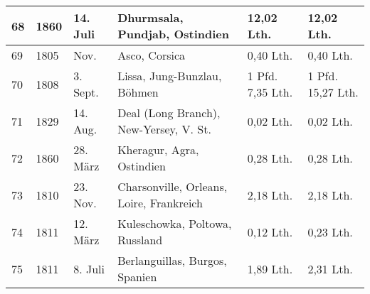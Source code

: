 \documentclass[a4paper, 11pt, oneside]{article}
\begin{document}
\begin{center}
\begin{footnotesize}
\begin{tabular}{ |p{7mm}|p{7mm}|p{13mm}|p{48mm}|p{22mm}|p{22mm}| }
    68 & 1860 & 14. Juli & Dhurmsala, Pundjab, Ostindien & 12,02 Lth. & 12,02 Lth.\\\hline
    69 & 1805 & Nov. & Asco, Corsica & 0,40 Lth. & 0,40 Lth.\\\hline
    70 & 1808 & 3. Sept. & Lissa, Jung-Bunzlau, Böhmen & 1 Pfd. 7,35 Lth. & 1 Pfd. 15,27 Lth.\\\hline
    71 & 1829 & 14. Aug. & Deal (Long Branch), New-Yersey, V. St. & 0,02 Lth. & 0,02 Lth.\\\hline
    72 & 1860 & 28. März & Kheragur, Agra, Ostindien & 0,28 Lth. & 0,28 Lth.\\\hline
    73 & 1810 & 23. Nov. & Charsonville, Orleans, Loire, Frankreich & 2,18 Lth. & 2,18 Lth.\\\hline
    74 & 1811 & 12. März & Kuleschowka, Poltowa, Russland & 0,12 Lth. & 0,23 Lth.\\\hline
    75 & 1811 & 8. Juli & Berlanguillas, Burgos, Spanien & 1,89 Lth. & 2,31 Lth.\\
    \hline
\end{tabular}
\end{footnotesize}
\end{center}
\end{document}
